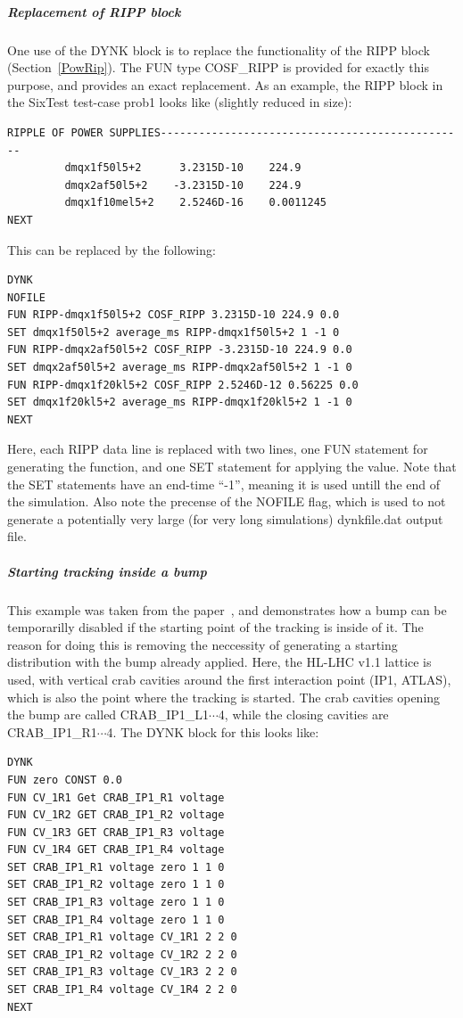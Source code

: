 \documentclass[a4paper,11pt]{report}
\begin{document}
\subparagraph{Replacement of RIPP block}
One use of the DYNK block is to replace the functionality of the RIPP block (Section~\ref{PowRip}).
The FUN type COSF\_RIPP is provided for exactly this purpose, and provides an exact replacement.
As an example, the RIPP block in the SixTest test-case prob1 looks like (slightly reduced in size):
\begin{verbatim}
RIPPLE OF POWER SUPPLIES------------------------------------------------
         dmqx1f50l5+2      3.2315D-10    224.9
         dmqx2af50l5+2    -3.2315D-10    224.9
         dmqx1f10mel5+2    2.5246D-16    0.0011245
NEXT
\end{verbatim}
This can be replaced by the following:
\begin{verbatim}
DYNK
NOFILE
FUN RIPP-dmqx1f50l5+2 COSF_RIPP 3.2315D-10 224.9 0.0
SET dmqx1f50l5+2 average_ms RIPP-dmqx1f50l5+2 1 -1 0
FUN RIPP-dmqx2af50l5+2 COSF_RIPP -3.2315D-10 224.9 0.0
SET dmqx2af50l5+2 average_ms RIPP-dmqx2af50l5+2 1 -1 0
FUN RIPP-dmqx1f20kl5+2 COSF_RIPP 2.5246D-12 0.56225 0.0
SET dmqx1f20kl5+2 average_ms RIPP-dmqx1f20kl5+2 1 -1 0
NEXT
\end{verbatim}
Here, each RIPP data line is replaced with two lines, one FUN statement for generating the function, and one SET statement for applying the value.
Note that the SET statements have an end-time ``-1'', meaning it is used untill the end of the simulation.
Also note the precense of the NOFILE flag, which is used to not generate a potentially very large (for very long simulations) dynkfile.dat output file.

\subparagraph{Starting tracking inside a bump}

This example was taken from the paper~\cite{DYNKpaper}, and demonstrates how a bump can be temporarilly disabled if the starting point of the tracking is inside of it.
The reason for doing this is removing the neccessity of generating a starting distribution with the bump already applied.
Here, the HL-LHC v1.1 lattice is used, with vertical crab cavities around the first interaction point (IP1, ATLAS), which is also the point where the tracking is started.
The crab cavities opening the bump are called CRAB\_IP1\_L1$\cdots$4, while the closing cavities are CRAB\_IP1\_R1$\cdots$4.
The DYNK block for this looks like:
\begin{verbatim}
DYNK
FUN zero CONST 0.0
FUN CV_1R1 Get CRAB_IP1_R1 voltage
FUN CV_1R2 GET CRAB_IP1_R2 voltage
FUN CV_1R3 GET CRAB_IP1_R3 voltage
FUN CV_1R4 GET CRAB_IP1_R4 voltage
SET CRAB_IP1_R1 voltage zero 1 1 0
SET CRAB_IP1_R2 voltage zero 1 1 0
SET CRAB_IP1_R3 voltage zero 1 1 0
SET CRAB_IP1_R4 voltage zero 1 1 0
SET CRAB_IP1_R1 voltage CV_1R1 2 2 0
SET CRAB_IP1_R2 voltage CV_1R2 2 2 0
SET CRAB_IP1_R3 voltage CV_1R3 2 2 0
SET CRAB_IP1_R4 voltage CV_1R4 2 2 0
NEXT
\end{verbatim}
\end{document}
